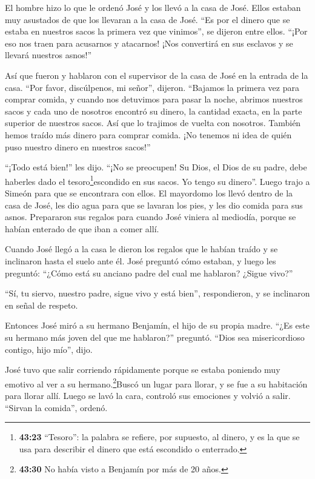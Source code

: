  El hombre hizo lo que le ordenó José y los llevó a la casa
de José.  Ellos estaban muy asustados de que los llevaran a
la casa de José. ``Es por el dinero que se estaba en nuestros sacos la
primera vez que vinimos'', se dijeron entre ellos. ``¡Por eso nos traen
para acusarnos y atacarnos! ¡Nos convertirá en sus esclavos y se llevará
nuestros asnos!''

 Así que fueron y hablaron con el supervisor de la casa de
José en la entrada de la casa.  ``Por favor, discúlpenos,
mi señor'', dijeron. ``Bajamos la primera vez para comprar comida,
 y cuando nos detuvimos para pasar la noche, abrimos
nuestros sacos y cada uno de nosotros encontró su dinero, la cantidad
exacta, en la parte superior de nuestros sacos. Así que lo trajimos de
vuelta con nosotros.  También hemos traído más dinero para
comprar comida. ¡No tenemos ni idea de quién puso nuestro dinero en
nuestros sacos!''

 ``¡Todo está bien!'' les dijo. ``¡No se preocupen! Su
Dios, el Dios de su padre, debe haberles dado el
tesoro\footnote{\textbf{43:23} ``Tesoro'': la palabra se refiere, por
  supuesto, al dinero, y es la que se usa para describir el dinero que
  está escondido o enterrado.}escondido en sus sacos. Yo tengo su
dinero''. Luego trajo a Simeón para que se encontrara con ellos.
 El mayordomo los llevó dentro de la casa de José, les dio
agua para que se lavaran los pies, y les dio comida para sus asnos.
 Prepararon sus regalos para cuando José viniera al
mediodía, porque se habían enterado de que iban a comer allí.

 Cuando José llegó a la casa le dieron los regalos que le
habían traído y se inclinaron hasta el suelo ante él.  José
preguntó cómo estaban, y luego les preguntó: ``¿Cómo está su anciano
padre del cual me hablaron? ¿Sigue vivo?''

 ``Sí, tu siervo, nuestro padre, sigue vivo y está bien'',
respondieron, y se inclinaron en señal de respeto.

 Entonces José miró a su hermano Benjamín, el hijo de su
propia madre. ``¿Es este su hermano más joven del que me hablaron?''
preguntó. ``Dios sea misericordioso contigo, hijo mío'', dijo.

 José tuvo que salir corriendo rápidamente porque se estaba
poniendo muy emotivo al ver a su hermano.\footnote{\textbf{43:30} No
  había visto a Benjamín por más de 20 años.}Buscó un lugar para llorar,
y se fue a su habitación para llorar allí.  Luego se lavó
la cara, controló sus emociones y volvió a salir. ``Sirvan la comida'',
ordenó.

